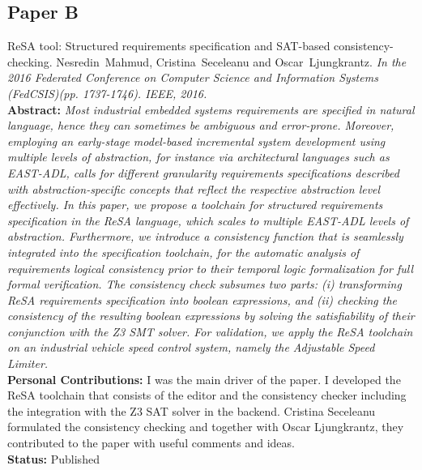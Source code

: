 \subsection*{Paper B}
ReSA tool: Structured requirements specification and SAT-based consistency-checking. Nesredin~Mahmud, Cristina~Seceleanu and Oscar~Ljungkrantz. \textit{In the 2016 Federated Conference on Computer Science and Information Systems (FedCSIS)(pp. 1737-1746). IEEE, 2016.}\label{lbl_resatool}\\[6pt]
\textbf{Abstract:} \textit{Most industrial embedded systems requirements are
	specified in natural language, hence they can sometimes be
		ambiguous and error-prone. Moreover, employing an early-stage
		model-based incremental system development using multiple
		levels of abstraction, for instance via architectural languages
		such as EAST-ADL, calls for different granularity requirements
		specifications described with abstraction-specific concepts that
		reflect the respective abstraction level effectively.
		In this paper, we propose a toolchain for structured requirements
		specification in the ReSA language, which scales to multiple
		EAST-ADL levels of abstraction. Furthermore, we introduce
		a consistency function that is seamlessly integrated into the
		specification toolchain, for the automatic analysis of requirements
		logical consistency prior to their temporal logic formalization
		for full formal verification. The consistency check subsumes
		two parts: (i) transforming ReSA requirements specification into
		boolean expressions, and (ii) checking the consistency of the
		resulting boolean expressions by solving the satisfiability of their
		conjunction with the Z3 SMT solver. For validation, we apply
		the ReSA toolchain on an industrial vehicle speed control system,
		namely the Adjustable Speed Limiter.}\\[6pt]%
	\textbf{Personal Contributions: }I was the main driver of the paper. I developed the ReSA toolchain that consists of the editor and the consistency checker including the integration with the Z3 SAT solver in the backend. Cristina Seceleanu formulated the consistency checking and together with Oscar Ljungkrantz, they contributed to the paper with useful comments and ideas.\\
		\textbf{Status: }Published


